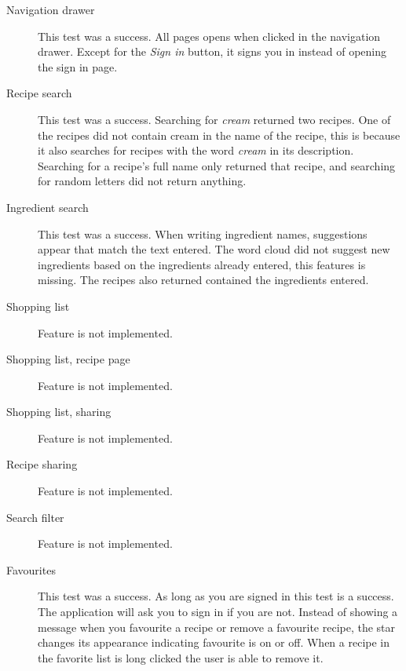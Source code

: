 \begin{description}
\item[Navigation drawer] This test was a success. All pages opens when clicked in the navigation drawer. Except for the \textit{Sign in} button, it signs you in instead of opening the sign in page.
\item[Recipe search] This test was a success. Searching for \textit{cream} returned two recipes. One of the recipes did not contain cream in the name of the recipe, this is because it also searches for recipes with the word \textit{cream} in its description. Searching for a recipe's full name only returned that recipe, and searching for random letters did not return anything.
\item[Ingredient search] This test was a success. When writing ingredient names, suggestions appear that match the text entered. The word cloud did not suggest new ingredients based on the ingredients already entered, this features is missing. The recipes also returned contained the ingredients entered.
\item[Shopping list] Feature is not implemented.
\item[Shopping list, recipe page] Feature is not implemented.
\item[Shopping list, sharing] Feature is not implemented.
\item[Recipe sharing] Feature is not implemented.
\item[Search filter] Feature is not implemented.
\item[Favourites] This test was a success. As long as you are signed in this test is a success. The application will ask you to sign in if you are not. Instead of showing a message when you favourite a recipe or remove a favourite recipe, the star changes its appearance indicating favourite is on or off. When a recipe in the favorite list is long clicked the user is able to remove it.
\end{description}